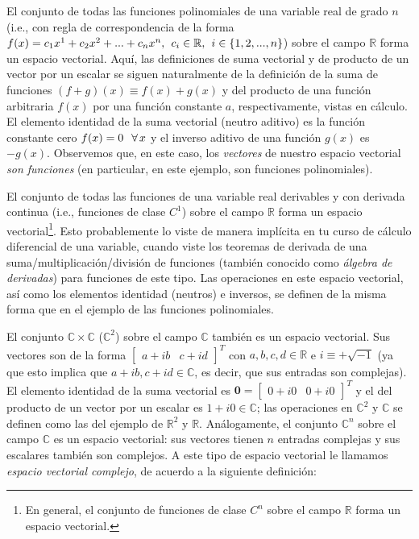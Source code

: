 \documentclass[12pt]{article}
\begin{document}
\vspace{3mm}

El conjunto de todas las funciones polinomiales de una variable real de grado $n$ (i.e., con regla de correspondencia de la forma $f(x) = c_1 x^1 + c_2 x^2 + ... + c_n x^n, \hspace{1.5mm} c_i \in \mathbb{R}, \hspace{1.5mm} i \in \{1,2,...,n\}$) sobre el campo $\mathbb{R}$ forma un espacio vectorial. Aquí, las definiciones de suma vectorial y de producto de un vector por un escalar se siguen naturalmente de la definición de la suma de funciones $(f+g)(x)\equiv f(x)+g(x)$ y del producto de una función arbitraria $f(x)$ por una función constante $a$, respectivamente, vistas en cálculo. El elemento identidad de la suma vectorial (neutro aditivo) es la función constante cero $f(x)=0\hspace{2.5mm} \forall\hspace{0.5mm}x$ y el inverso aditivo de una función $g(x)$ es $-g(x)$. Observemos que, en este caso, los \textit{vectores} de nuestro espacio vectorial \textit{son funciones} (en particular, en este ejemplo, son funciones polinomiales).

\vspace{3mm}

El conjunto de todas las funciones de una variable real derivables y con derivada continua (i.e., funciones de clase $C^1$) sobre el campo $\mathbb{R}$ forma un espacio vectorial\footnote{En general, el conjunto de funciones de clase $C^n$ sobre el campo $\mathbb{R}$ forma un espacio vectorial.}. Esto probablemente lo viste de manera implícita en tu curso de cálculo diferencial de una variable, cuando viste los teoremas de derivada de una suma/multiplicación/división de funciones (también conocido como \emph{álgebra de derivadas}) para funciones de este tipo. Las operaciones en este espacio vectorial, así como los elementos identidad (neutros) e inversos, se definen de la misma forma que en el ejemplo de las funciones polinomiales.

\vspace{3mm}

El conjunto $\mathbb{C}\times\mathbb{C}$ ($\mathbb{C}^2$) sobre el campo $\mathbb{C}$ también es un espacio vectorial. Sus vectores son de la forma $\begin{bmatrix}a+ib&c+id\end{bmatrix}^T$ con $a,b,c,d\in\mathbb{R}$ e $i\equiv+\sqrt{-1}$ (ya que esto implica que $a+ib, c+id\in\mathbb{C}$, es decir, que sus entradas son complejas). El elemento identidad de la suma vectorial es $\mathbf{0}=\begin{bmatrix}0+i0&0+i0\end{bmatrix}^T$ y el del producto de un vector por un escalar es $1 + i0\in\mathbb{C}$; las operaciones en $\mathbb{C}^2$ y $\mathbb{C}$ se definen como las del ejemplo de $\mathbb{R}^2$ y $\mathbb{R}$. Análogamente, el conjunto $\mathbb{C}^n$ sobre el campo $\mathbb{C}$ es un espacio vectorial: sus vectores tienen $n$ entradas complejas y sus escalares también son complejos. A este tipo de espacio vectorial le llamamos \textit{espacio vectorial complejo}, de acuerdo a la siguiente definición:
\end{document}
